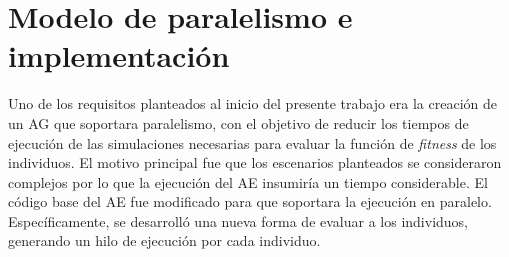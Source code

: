 \newpage

\section{Modelo de paralelismo e implementación}





Uno de los requisitos planteados al inicio del presente trabajo era la creación de un AG que soportara paralelismo, con el objetivo de reducir los tiempos de ejecución de las simulaciones necesarias para evaluar la función de \emph{fitness} de los individuos. El motivo principal fue que los escenarios planteados se consideraron complejos por lo que la ejecución del AE insumiría un tiempo considerable. El código base del AE fue modificado para que soportara la ejecución en paralelo. Específicamente, se desarrolló una nueva forma de evaluar a los individuos, generando un hilo de ejecución por cada individuo.

